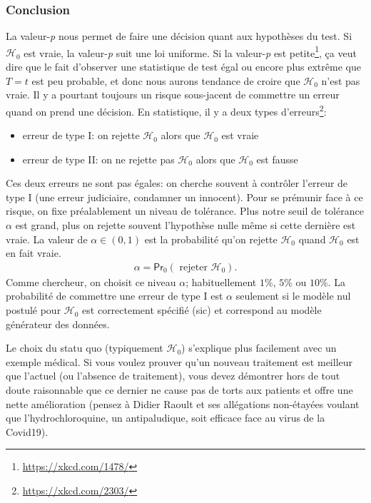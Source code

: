 \documentclass[
  11pt,
  letterpaper,
]{article}
\providecommand{\tightlist}{%
  \setlength{\itemsep}{0pt}\setlength{\parskip}{0pt}}
\renewcommand{\href}[2]{#2\footnote{\url{#1}}}
\theoremstyle{definition}
\theoremstyle{definition}
\theoremstyle{definition}
\theoremstyle{remark}
\begin{document}
\hypertarget{conclusion}{%
\subsubsection{Conclusion}\label{conclusion}}

La valeur-\emph{p} nous permet de faire une décision quant aux hypothèses du test. Si \(\mathscr{H}_0\) est vraie, la valeur-\emph{p} suit une loi uniforme. \href{https://xkcd.com/1478/}{Si la valeur-\emph{p} est petite}, ça veut dire que le fait d'observer une statistique de test égal ou encore plus extrême que \(T=t\) est peu probable, et donc nous aurons tendance de croire que \(\mathscr{H}_0\) n'est pas vraie. Il y a pourtant toujours un risque sous-jacent de commettre un erreur quand on prend une décision. En statistique, il y a \href{https://xkcd.com/2303/}{deux types d'erreurs}:

\begin{itemize}
\tightlist
\item
  erreur de type I: on rejette \(\mathscr{H}_0\) alors que \(\mathscr{H}_0\) est vraie
\item
  erreur de type II: on ne rejette pas \(\mathscr{H}_0\) alors que \(\mathscr{H}_0\) est fausse
\end{itemize}

Ces deux erreurs ne sont pas égales: on cherche souvent à contrôler l'erreur de type I (une erreur judiciaire, condamner un innocent). Pour se prémunir face à ce risque, on fixe préalablement un niveau de tolérance. Plus notre seuil de tolérance \(\alpha\) est grand, plus on rejette souvent l'hypothèse nulle même si cette dernière est vraie.
La valeur de \(\alpha \in (0, 1)\) est la probabilité qu'on rejette \(\mathscr{H}_0\) quand \(\mathscr{H}_0\) est en fait vraie.
\begin{align*}
\alpha = \mathsf{Pr}_0\left(\text{ rejeter } \mathscr{H}_0\right).
\end{align*}
Comme chercheur, on choisit ce niveau \(\alpha\); habituellement \(1\)\%, \(5\)\% ou \(10\)\%. La probabilité de commettre une erreur de type I est \(\alpha\) seulement si le modèle nul postulé pour \(\mathscr{H}_0\) est correctement spécifié (sic) et correspond au modèle générateur des données.

Le choix du statu quo (typiquement \(\mathscr{H}_0\)) s'explique plus facilement avec un exemple médical. Si vous voulez prouver qu'un nouveau traitement est meilleur que l'actuel (ou l'absence de traitement), vous devez démontrer hors de tout doute raisonnable que ce dernier ne cause pas de torts aux patients et offre une nette amélioration (pensez à Didier Raoult et ses allégations non-étayées voulant que l'hydrochloroquine, un antipaludique, soit efficace face au virus de la Covid19).
\end{document}
